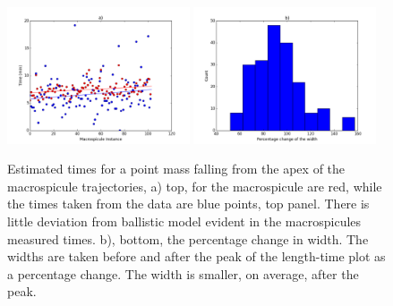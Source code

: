 \begin{figure}[h!]
	\centering
	\includegraphics[width=0.48\textwidth]{Chapter3/Figs/times_falling.pdf}
	\includegraphics[width=0.48\textwidth]{Chapter3/Figs/width_percent.pdf}
	
	\caption{\small Estimated times for a point mass falling from the apex of the macrospicule trajectories, a) top, for the macrospicule are red, while the times taken from the data are blue points, top panel. There is little deviation from ballistic model evident in the macrospicules measured times. b), bottom, the percentage change in width. The widths are taken before and after the peak of the length-time plot as a percentage change. The width is smaller, on average, after the peak.}
	\label{fig:ballistics}
\end{figure}

